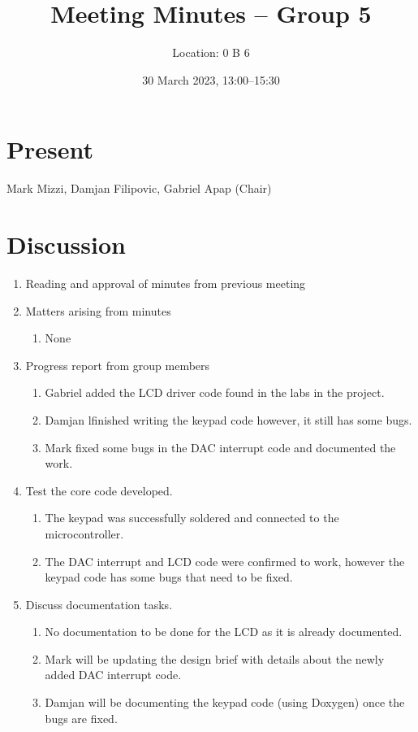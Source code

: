 \documentclass[11pt,a4paper]{scrartcl}
\title{Meeting Minutes -- Group 5}
\author{Location: 0 B 6}
\date{30 March 2023, 13:00--15:30}
\begin{document}
\maketitle

\section*{Present}
Mark Mizzi,
Damjan Filipovic,
Gabriel Apap (Chair)

\section*{Discussion}

\begin{enumerate}

   \item Reading and approval of minutes from previous meeting

   \item Matters arising from minutes
    \begin{enumerate}
        \item None
    \end{enumerate}
   
   \item Progress report from group members
      \begin{enumerate}
         \item Gabriel added the LCD driver code found in the labs in the project.

         \item Damjan lfinished writing the keypad code however, it still has some bugs.

         \item Mark fixed some bugs in the DAC interrupt code and documented the work.
      \end{enumerate}
   
   \item Test the core code developed.
      \begin{enumerate}
         \item The keypad was successfully soldered and connected to the microcontroller.
         \item The DAC interrupt and LCD code were confirmed to work, however the keypad code has some bugs that need to be fixed.
      \end{enumerate}
   
   \item Discuss documentation tasks.
      \begin{enumerate}
         \item No documentation to be done for the LCD as it is already documented.
         \item Mark will be updating the design brief with details about the newly added DAC interrupt code.
         \item Damjan will be documenting the keypad code (using Doxygen) once the bugs are fixed.
      \end{enumerate}
   

\end{enumerate}
\end{document}

